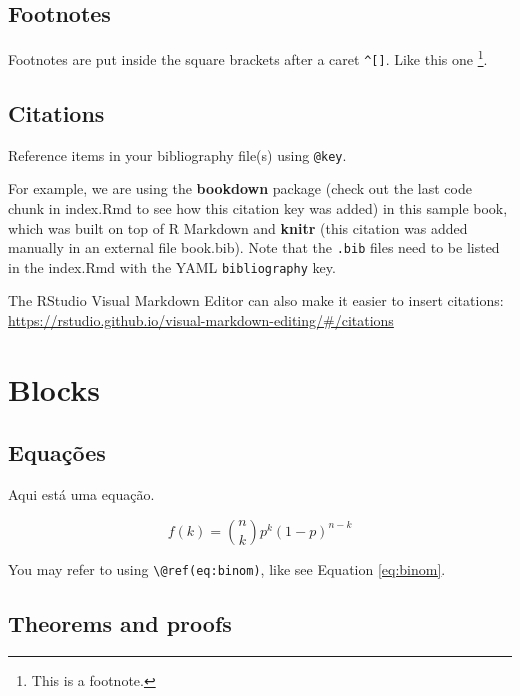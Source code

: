 \documentclass[
]{book}
\begin{document}
\hypertarget{footnotes}{%
\section{Footnotes}\label{footnotes}}

Footnotes are put inside the square brackets after a caret \texttt{\^{}{[}{]}}. Like this one \footnote{This is a footnote.}.

\hypertarget{citations}{%
\section{Citations}\label{citations}}

Reference items in your bibliography file(s) using \texttt{@key}.

For example, we are using the \textbf{bookdown} package \citep{R-bookdown} (check out the last code chunk in index.Rmd to see how this citation key was added) in this sample book, which was built on top of R Markdown and \textbf{knitr} \citep{xie2015} (this citation was added manually in an external file book.bib).
Note that the \texttt{.bib} files need to be listed in the index.Rmd with the YAML \texttt{bibliography} key.

The RStudio Visual Markdown Editor can also make it easier to insert citations: \url{https://rstudio.github.io/visual-markdown-editing/\#/citations}

\hypertarget{blocks}{%
\chapter{Blocks}\label{blocks}}

\hypertarget{equauxe7uxf5es}{%
\section{Equações}\label{equauxe7uxf5es}}

Aqui está uma equação.

\begin{equation} 
  f\left(k\right) = \binom{n}{k} p^k\left(1-p\right)^{n-k}
  \label{eq:binom}
\end{equation}

You may refer to using \texttt{\textbackslash{}@ref(eq:binom)}, like see Equation \eqref{eq:binom}.

\hypertarget{theorems-and-proofs}{%
\section{Theorems and proofs}\label{theorems-and-proofs}}
\end{document}
